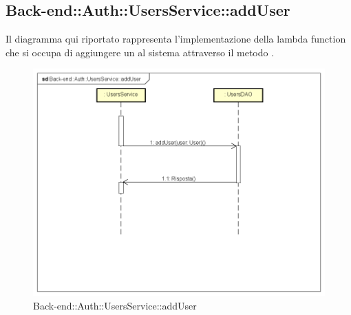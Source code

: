 \subsection{Back-end::Auth::UsersService::addUser}
Il diagramma qui riportato rappresenta l'implementazione della lambda function che si occupa di aggiungere un  al sistema attraverso il metodo . 
 \begin{figure}[h] \centering \includegraphics[width=\textwidth,height=\textheight,keepaspectratio]{images/diagrams/back-end/Ufficial_Backend/Back-endAuthUsersServiceaddUser.png} 	\caption{Back-end::Auth::UsersService::addUser}
\end{figure}

\newpage
